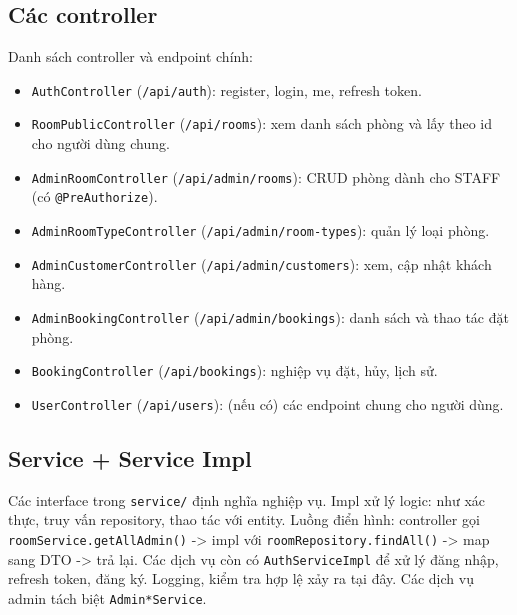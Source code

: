 \documentclass[12pt,a4paper]{article}
\begin{document}
\subsection{Các controller}
Danh sách controller và endpoint chính:
\begin{itemize}
    \item \texttt{AuthController} (\texttt{/api/auth}): register, login,
    me, refresh token.
    \item \texttt{RoomPublicController} (\texttt{/api/rooms}): xem danh sách
    phòng và lấy theo id cho người dùng chung.
    \item \texttt{AdminRoomController} (\texttt{/api/admin/rooms}): CRUD phòng
    dành cho STAFF (có \texttt{@PreAuthorize}).
    \item \texttt{AdminRoomTypeController} (\texttt{/api/admin/room-types}): quản lý
    loại phòng.
    \item \texttt{AdminCustomerController} (\texttt{/api/admin/customers}): xem,
    cập nhật khách hàng.
    \item \texttt{AdminBookingController} (\texttt{/api/admin/bookings}): danh sách
    và thao tác đặt phòng.
    \item \texttt{BookingController} (\texttt{/api/bookings}): nghiệp vụ đặt,
    hủy, lịch sử.
    \item \texttt{UserController} (\texttt{/api/users}): (nếu có) các endpoint
    chung cho người dùng.
\end{itemize}

\subsection{Service + Service Impl}
Các interface trong \texttt{service/} định nghĩa nghiệp vụ. Impl xử lý logic:
như xác thực, truy vấn repository, thao tác với entity.
Luồng điển hình: controller gọi \texttt{roomService.getAllAdmin()} ->
impl với \texttt{roomRepository.findAll()} -> map sang DTO -> trả lại.
Các dịch vụ còn có \texttt{AuthServiceImpl} để xử lý đăng nhập,
refresh token, đăng ký. Logging, kiểm tra hợp lệ xảy ra tại đây.
Các dịch vụ admin tách biệt \texttt{Admin*Service}.
\end{document}
